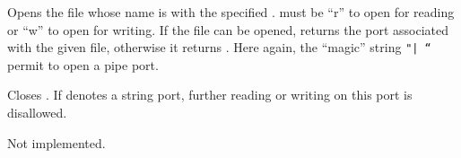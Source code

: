 \begin{entry}{%
}
\saut
Opens the file whose name is  with the specified
.  must be ``r'' to open for reading or ``w''
to open for writing. If the file can be opened, 
returns the port associated with the given file, otherwise it returns
{\schfalse}. Here again, the ``magic'' string {\tt "|~``} permit to
open a pipe port.
\end{entry}

\begin{entry}{%
}
\saut
Closes . If  denotes a string port, further
reading or writing on this port is disallowed.
\end{entry}

\begin{entry}{%
\nopagebreak{}
}
\saut
Not implemented.
\end{entry}

